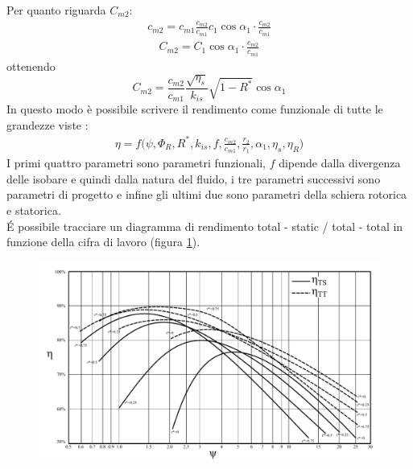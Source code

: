 Per quanto riguarda $C_{m2}$:
\begin{align*}
c_{m2} = c_{m1} \frac{c_{m2}}{c_{m1}} c_1 \cos \alpha_1 \cdot \frac{c_{m2}}{c_{m1}}
\end{align*}
\begin{align*}
C_{m2} = C_1 \cos \alpha_1 \cdot \frac{c_{m2}}{c_{m1}}
\end{align*}
ottenendo
\begin{equation}
\boxed{C_{m2} = \frac{c_{m2}}{c_{m1}} \frac{\sqrt{\eta_s}}{k_{is}} \sqrt{1 - R^*} \cos \alpha_1 }
\end{equation}
In questo modo è possibile scrivere il rendimento come funzionale di tutte le grandezze viste :
\begin{align*}
\eta = f \bigg( \psi, \Phi_R, R^*, k_{is}, f, \frac{c_{m2}}{c_{m1}}, \frac{r_2}{r_1}, \alpha_1, \eta_s, \eta_R \bigg)
\end{align*}
I primi quattro parametri sono parametri funzionali, $f$ dipende dalla divergenza delle isobare e quindi dalla natura del fluido, i tre parametri successivi sono parametri di progetto e infine gli ultimi due sono parametri della schiera rotorica e statorica.\\
\'E possibile tracciare un diagramma di rendimento total - static / total - total in funzione della cifra di lavoro (figura \ref{fig:Rendimenti_ts_tt}). 
\begin{figure}
\centering
  \includegraphics[width=.8\textwidth]{fig/Rendimenti_ts_tt.pdf}
\caption{}
\label{fig:Rendimenti_ts_tt}
\end{figure}
